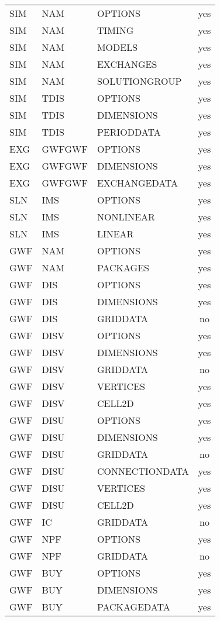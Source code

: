 \begin{longtable}{p{1.5cm} p{1.5cm} p{3cm} c}
\hline
SIM & NAM & OPTIONS & yes \\ 
SIM & NAM & TIMING & yes \\ 
SIM & NAM & MODELS & yes \\ 
SIM & NAM & EXCHANGES & yes \\ 
SIM & NAM & SOLUTIONGROUP & yes \\ 
\hline
SIM & TDIS & OPTIONS & yes \\ 
SIM & TDIS & DIMENSIONS & yes \\ 
SIM & TDIS & PERIODDATA & yes \\ 
\hline
EXG & GWFGWF & OPTIONS & yes \\ 
EXG & GWFGWF & DIMENSIONS & yes \\ 
EXG & GWFGWF & EXCHANGEDATA & yes \\ 
\hline
SLN & IMS & OPTIONS & yes \\ 
SLN & IMS & NONLINEAR & yes \\ 
SLN & IMS & LINEAR & yes \\ 
\hline
GWF & NAM & OPTIONS & yes \\ 
GWF & NAM & PACKAGES & yes \\ 
\hline
GWF & DIS & OPTIONS & yes \\ 
GWF & DIS & DIMENSIONS & yes \\ 
GWF & DIS & GRIDDATA & no \\ 
\hline
GWF & DISV & OPTIONS & yes \\ 
GWF & DISV & DIMENSIONS & yes \\ 
GWF & DISV & GRIDDATA & no \\ 
GWF & DISV & VERTICES & yes \\ 
GWF & DISV & CELL2D & yes \\ 
\hline
GWF & DISU & OPTIONS & yes \\ 
GWF & DISU & DIMENSIONS & yes \\ 
GWF & DISU & GRIDDATA & no \\ 
GWF & DISU & CONNECTIONDATA & yes \\ 
GWF & DISU & VERTICES & yes \\ 
GWF & DISU & CELL2D & yes \\ 
\hline
GWF & IC & GRIDDATA & no \\ 
\hline
GWF & NPF & OPTIONS & yes \\ 
GWF & NPF & GRIDDATA & no \\ 
\hline
GWF & BUY & OPTIONS & yes \\ 
GWF & BUY & DIMENSIONS & yes \\ 
GWF & BUY & PACKAGEDATA & yes \\ 

\end{longtable}
